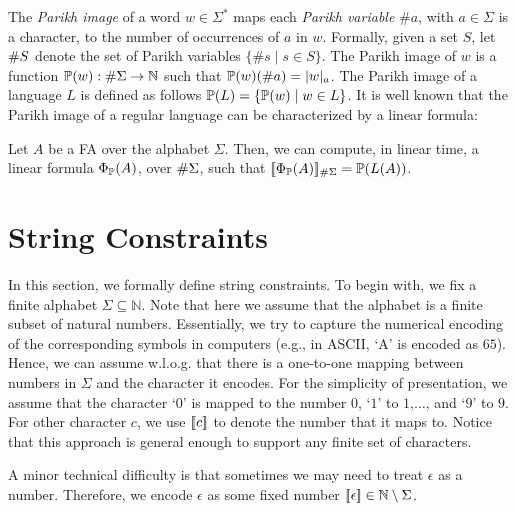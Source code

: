 \documentclass[sigplan,screen]{acmart}
\begin{document}
The \emph{Parikh image} of a word $w\in \Sigma^*$ maps each \emph{Parikh variable} $\#a$, with $a \in \Sigma$ is a character, to the number of occurrences of $a$ in $w$.
Formally, given a set $S$, let $\#{S}$ denote the set of Parikh variables $\{\#s \mid s\in S\}$. 
The Parikh image of $w$ is a function $\mathbb{P}{(w)}:\#{\Sigma} \rightarrow \mathbb{N}$ such that $\mathbb{P}{(w)} (\#a) = |w|_a$. 
The Parikh image of a language $L$ is defined as follows $\mathbb{P}{(L)} = \{\mathbb{P}{(w)} \mid w \in L\}$. %
%
It is well known that the Parikh image of a regular language  can be  characterized by a linear formula:



\begin{lemma}
Let $A$ be a FA over the alphabet $\Sigma$. Then, we can compute, in linear time,  a linear formula $\Phi_{\mathbb{P}}(A)$, over $\#{\Sigma}$, such that $[\![\Phi_{\mathbb{P}}(A)]\!]_{\#\Sigma} = \mathbb{P}{(L(A))}$.
\end{lemma}



 


\section{String Constraints} \label{section:sc}


In this section, we formally define string constraints. To begin with, we fix a finite alphabet $\Sigma \subseteq \mathbb{N}$. Note that here we assume that the alphabet is a finite subset of natural numbers. Essentially, we try to capture the numerical encoding of the corresponding symbols in computers (e.g., in ASCII, `A' is encoded as $65$). Hence, we can  assume w.l.o.g. that  there is a one-to-one mapping between numbers in $\Sigma$ and the character it encodes. For the simplicity of presentation, we assume that the character `$0$' is mapped to the number $0$, `$1$' to $1$,$\ldots$, and `$9$' to $9$. For other character $c$, we use $[\![c]\!]$ to denote the number that it maps to. Notice that this approach is general enough to support any finite set of characters. 


A minor technical difficulty is that sometimes  we may need to treat  $\epsilon$ as a  number. Therefore, we encode $\epsilon$ as some fixed number $[\![\epsilon]\!]\in\mathbb{N}\setminus\Sigma$.
\end{document}
